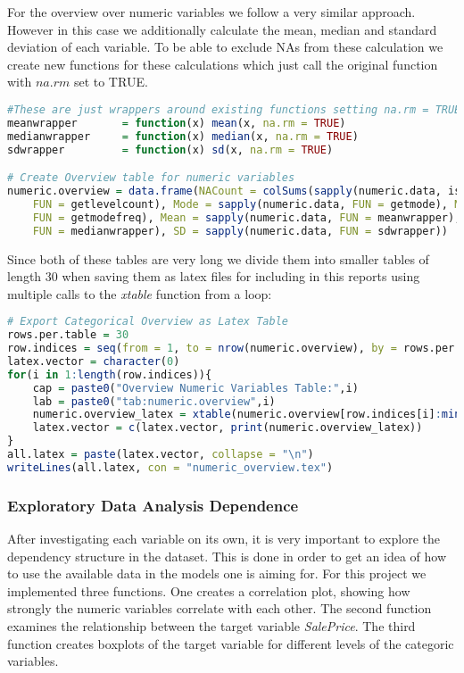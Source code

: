 For the overview over numeric variables we follow a very similar approach. However in this case we additionally calculate the mean, median and standard deviation of each variable. To be able to exclude NAs from these calculation we create new functions for these calculations which just call the original function with $na.rm$ set to TRUE.
\begin{lstlisting}[language=R]
#These are just wrappers around existing functions setting na.rm = TRUE
meanwrapper       = function(x) mean(x, na.rm = TRUE)
medianwrapper     = function(x) median(x, na.rm = TRUE)
sdwrapper         = function(x) sd(x, na.rm = TRUE)

# Create Overview table for numeric variables
numeric.overview = data.frame(NACount = colSums(sapply(numeric.data, is.na)), LevelCount = sapply(numeric.data, 
    FUN = getlevelcount), Mode = sapply(numeric.data, FUN = getmode), ModeFrequency = sapply(numeric.data, 
    FUN = getmodefreq), Mean = sapply(numeric.data, FUN = meanwrapper), Median = sapply(numeric.data, 
    FUN = medianwrapper), SD = sapply(numeric.data, FUN = sdwrapper))
\end{lstlisting} 
Since both of these tables are very long we divide them into smaller tables of length 30 when saving them as latex files for including in this reports using multiple calls to the \textit{xtable} function from a loop:
\begin{lstlisting}[language=R]
# Export Categorical Overview as Latex Table
rows.per.table = 30
row.indices = seq(from = 1, to = nrow(numeric.overview), by = rows.per.table)
latex.vector = character(0)
for(i in 1:length(row.indices)){
    cap = paste0("Overview Numeric Variables Table:",i)
    lab = paste0("tab:numeric.overview",i)
    numeric.overview_latex = xtable(numeric.overview[row.indices[i]:min(row.indices[i] + rows.per.table - 1, nrow(numeric.overview)),,drop = FALSE], caption = cap, label =lab)
    latex.vector = c(latex.vector, print(numeric.overview_latex))
}
all.latex = paste(latex.vector, collapse = "\n")
writeLines(all.latex, con = "numeric_overview.tex")
\end{lstlisting} 


\subsubsection{Exploratory Data Analysis Dependence}
After investigating each variable on its own, it is very important to explore the dependency structure in the dataset. This is done in order to get an idea of how to use the available data in the models one is aiming for. For this project we implemented three functions. One creates a correlation plot, showing how strongly the numeric variables correlate with each other. The second function examines the relationship between the target variable \textit{SalePrice}. The third function creates boxplots of  the target variable for different levels of the categoric variables. 

